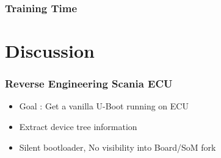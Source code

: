 \documentclass{beamer}
\begin{document}
\begin{frame}
  \frametitle{Training Time}

  \begin{figure}[!ht]
    \centering
    \resizebox{\columnwidth}{!}{%
    }
  \end{figure}

\end{frame}


\begin{frame}

  \begin{figure}[ht]
	\centering
	\scalebox{0.64}{}
  \end{figure}

\end{frame}

\begin{frame}

  \begin{figure}[ht]
	\centering
	\scalebox{0.64}{}
  \end{figure}

\end{frame}

\begin{frame}

  \begin{figure}[ht]
	\centering
	\scalebox{0.64}{}
  \end{figure}

\end{frame}

\begin{frame}

  \begin{figure}[ht]
	\centering
	\scalebox{0.64}{}
  \end{figure}

\end{frame}
\section{Discussion}

\begin{frame}
  \frametitle{Reverse Engineering Scania ECU}

  \begin{itemize}
    \item Goal : Get a vanilla U-Boot running on ECU
    \item Extract device tree information
    \item Silent bootloader, No visibility into Board/SoM fork
  \end{itemize}

\end{frame}
\end{document}
